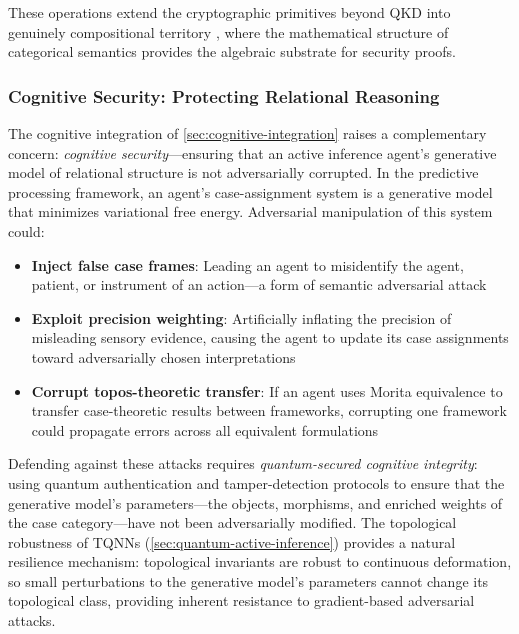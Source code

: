 \documentclass[
]{article}
\providecommand{\tightlist}{%
  \setlength{\itemsep}{0pt}\setlength{\parskip}{0pt}}
\numberwithin{equation}{section}
\begin{document}
These operations extend the cryptographic primitives beyond QKD into
genuinely compositional territory \citep{broadbent2016qcrypto}, where
the mathematical structure of categorical semantics provides the
algebraic substrate for security proofs.

\subsubsection{Cognitive Security: Protecting Relational
Reasoning}\label{cognitive-security-protecting-relational-reasoning}

The cognitive integration of \autoref{sec:cognitive-integration} raises
a complementary concern: \emph{cognitive security}---ensuring that an
active inference agent's generative model of relational structure is not
adversarially corrupted. In the predictive processing framework, an
agent's case-assignment system is a generative model that minimizes
variational free energy. Adversarial manipulation of this system could:

\begin{itemize}
\tightlist
\item
  \textbf{Inject false case frames}: Leading an agent to misidentify the
  agent, patient, or instrument of an action---a form of semantic
  adversarial attack
\item
  \textbf{Exploit precision weighting}: Artificially inflating the
  precision of misleading sensory evidence, causing the agent to update
  its case assignments toward adversarially chosen interpretations
\item
  \textbf{Corrupt topos-theoretic transfer}: If an agent uses Morita
  equivalence to transfer case-theoretic results between frameworks,
  corrupting one framework could propagate errors across all equivalent
  formulations
\end{itemize}

Defending against these attacks requires \emph{quantum-secured cognitive
integrity}: using quantum authentication and tamper-detection protocols
to ensure that the generative model's parameters---the objects,
morphisms, and enriched weights of the case category---have not been
adversarially modified. The topological robustness of TQNNs
(\autoref{sec:quantum-active-inference}) provides a natural resilience
mechanism: topological invariants are robust to continuous deformation,
so small perturbations to the generative model's parameters cannot
change its topological class, providing inherent resistance to
gradient-based adversarial attacks.
\end{document}
